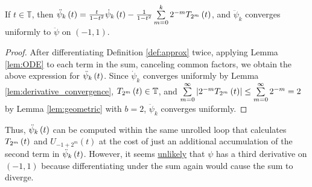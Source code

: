 \begin{lemma}
  \label{lem:second_derivative}
  If $t \in \mathbb{T}$, then $\ddot{\psi}_{k}\left(t\right) = \frac{t}{1 - t^2} \dot{\psi}_{k}\left(t\right) - \frac{1}{1 - t^2} \sum\limits_{m = 0}^k 2^{-m} T_{2^{m}}\left(t\right)$, and $\ddot{\psi}_k$ converges uniformly to $\ddot{\psi}$ on $\left(-1,1\right)$.
\end{lemma}
\begin{proof}
  After differentiating Definition \ref{def:approx} twice, applying Lemma \ref{lem:ODE} to each term in the sum, canceling common factors, we obtain the above expression for $\ddot{\psi}_{k}\left(t\right)$. Since $\dot{\psi}_k$ converges uniformly by Lemma \ref{lem:derivative_convergence}, $T_{2^{m}}\left(t\right) \in \mathbb{T}$, and $\sum\limits_{m = 0}^\infty \left|2^{-m} T_{2^{m}}\left(t\right)\right| \leq \sum\limits_{m = 0}^\infty 2^{-m} = 2$ by Lemma \ref{lem:geometric} with $b = 2$, $\ddot{\psi}_k$ converges uniformly.
 \end{proof}
\noindent Thus, $\ddot{\psi}_{k}\left(t\right)$ can be computed within the same unrolled loop that calculates $T_{2^{m}}\left(t\right)$ and $U_{-1 + 2^m}\left(t\right)$ at the cost of just an additional accumulation of the second term in $\ddot{\psi}_{k}\left(t\right)$. However, it seems \underline{unlikely} that $\psi$ has a third derivative on $\left(-1,1\right)$ because differentiating under the sum again would cause the sum to diverge.

